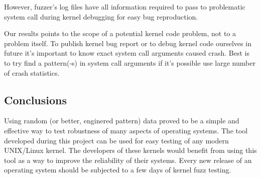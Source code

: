 \documentclass[twoside]{article}
\begin{document}
\begin{multicols}{2}
However, fuzzer's log files have all information required to pass to problematic system call during kernel debugging for easy bug reproduction.

Our results points to the scope of a potential kernel code problem, not to a problem itself. To publish kernel bug report or to debug kernel code ourselves in future it's important to know exact system call arguments caused crash. Best is to try find a pattern(-s) in system call arguments if it's possible use large number of crash statistics. 

\subsection{Conclusions}

Using random (or better, enginered pattern) data proved to be a simple and effective way to test robustness of many aspects of operating systems. The tool developed during this project can be used for easy testing of any modern UNIX/Linux kernel. The developers of these kernels would benefit from using this tool as a way to improve the reliability of their systems. Every new release of an operating system should be subjected to a few days of kernel fuzz testing.



 
 
 
 \nocite{*}
 
 
 



\end{multicols}
\end{document}
